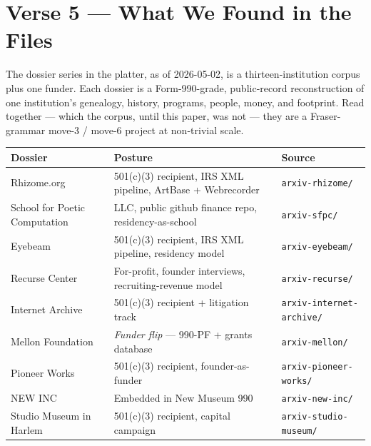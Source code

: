 \documentclass[10pt,letterpaper,twocolumn]{article}
\newcommand{\papercreated}{2026-05-02}
\begin{document}
\section{Verse 5 --- What We Found in the Files}

The dossier series in the platter, as of \papercreated, is a thirteen-institution corpus plus one funder. Each dossier is a Form-990-grade, public-record reconstruction of one institution's genealogy, history, programs, people, money, and footprint. Read together --- which the corpus, until this paper, was not --- they are a Fraser-grammar move-3 / move-6 project at non-trivial scale.

\begin{table}[t]
\footnotesize
\centering
\setlength{\tabcolsep}{4pt}
\renewcommand{\arraystretch}{1.15}
\begin{tabularx}{\textwidth}{l>{\raggedright\arraybackslash\hspace{0pt}}Xl}
\toprule
\textbf{Dossier} & \textbf{Posture} & \textbf{Source} \\
\midrule
Rhizome.org & 501(c)(3) recipient, IRS XML pipeline, ArtBase + Webrecorder & \texttt{arxiv-rhizome/} \citep{ac2026rhizome} \\
School for Poetic Computation & LLC, public github finance repo, residency-as-school & \texttt{arxiv-sfpc/} \citep{ac2026sfpc} \\
Eyebeam & 501(c)(3) recipient, IRS XML pipeline, residency model & \texttt{arxiv-eyebeam/} \citep{ac2026eyebeam} \\
Recurse Center & For-profit, founder interviews, recruiting-revenue model & \texttt{arxiv-recurse/} \citep{ac2026recurse} \\
Internet Archive & 501(c)(3) recipient + litigation track & \texttt{arxiv-internet-archive/} \citep{ac2026internetarchive} \\
Mellon Foundation & \emph{Funder flip} --- 990-PF + grants database & \texttt{arxiv-mellon/} \citep{ac2026mellon} \\
Pioneer Works & 501(c)(3) recipient, founder-as-funder & \texttt{arxiv-pioneer-works/} \citep{ac2026pioneerworks} \\
NEW INC & Embedded in New Museum 990 & \texttt{arxiv-new-inc/} \citep{ac2026newinc} \\
Studio Museum in Harlem & 501(c)(3) recipient, capital campaign & \texttt{arxiv-studio-museum/} \citep{ac2026studiomuseum} \\

\end{tabularx}
\end{table}
\end{document}
